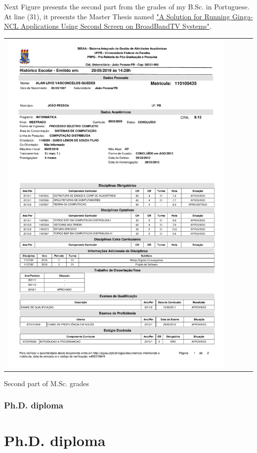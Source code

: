 \documentclass[10pt,a4paper,sans,colorlinks]{moderncv}
\begin{document}
\newpage
Next Figure presents the second part from the grades of my B.Sc. in Portuguese.
At line (31), it presents the Master Thesis named \href{https://repositorio.ufpb.br/jspui/handle/tede/6087}{"A Solution for Running Ginga-NCL Applications Using Second Screen on BroadBandTV Systems"}.
\vspace{1em}
\begin{Figure}
  \begin{tabularx}{\textwidth}{X p{1cm}}
    \includegraphics[align=t,width=0.92\textwidth, keepaspectratio, page=2, trim=0cm 0cm 0cm 2cm]{certificates/msc-grades.pdf}
  \end{tabularx}
  \caption{Second part of M.Sc. grades}
\end{Figure}


\newpage
\section{Ph.D. diploma}\part{Ph.D. diploma}
\end{document}
